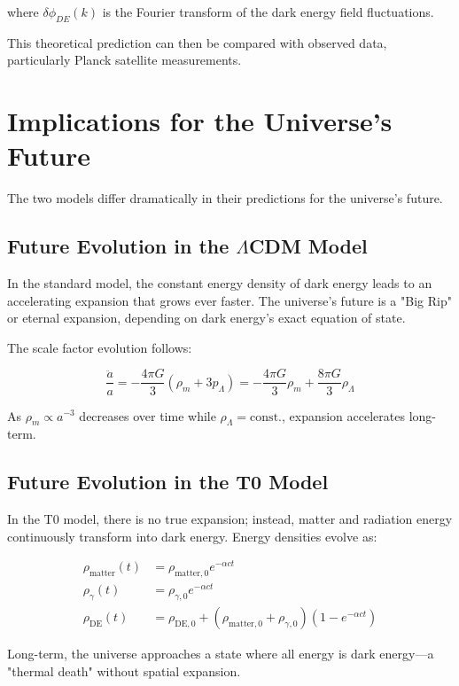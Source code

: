 \documentclass[a4paper,12pt]{article}
\theoremstyle{definition}
\theoremstyle{remark}
\begin{document}
	where $\delta\phi_{DE}(k)$ is the Fourier transform of the dark energy field fluctuations.
	
	This theoretical prediction can then be compared with observed data, particularly Planck satellite measurements.
	
	\section{Implications for the Universe’s Future}
	The two models differ dramatically in their predictions for the universe’s future.
	
	\subsection{Future Evolution in the $\Lambda$CDM Model}
	In the standard model, the constant energy density of dark energy leads to an accelerating expansion that grows ever faster. The universe’s future is a "Big Rip" or eternal expansion, depending on dark energy’s exact equation of state.
	
	The scale factor evolution follows:
	
	\begin{equation}
		\frac{\ddot{a}}{a} = -\frac{4\pi G}{3}(\rho_m + 3p_\Lambda) = -\frac{4\pi G}{3}\rho_m + \frac{8\pi G}{3}\rho_\Lambda
	\end{equation}
	
	As $\rho_m \propto a^{-3}$ decreases over time while $\rho_\Lambda = \text{const.}$, expansion accelerates long-term.
	
	\subsection{Future Evolution in the T0 Model}
	In the T0 model, there is no true expansion; instead, matter and radiation energy continuously transform into dark energy. Energy densities evolve as:
	
	\begin{align}
		\rho_{\text{matter}}(t) &= \rho_{\text{matter},0} e^{-\alpha c t} \\
		\rho_{\gamma}(t) &= \rho_{\gamma,0} e^{-\alpha c t} \\
		\rho_{\text{DE}}(t) &= \rho_{\text{DE},0} + (\rho_{\text{matter},0} + \rho_{\gamma,0})(1 - e^{-\alpha c t})
	\end{align}
	
	Long-term, the universe approaches a state where all energy is dark energy—a "thermal death" without spatial expansion.
	
\end{document}
